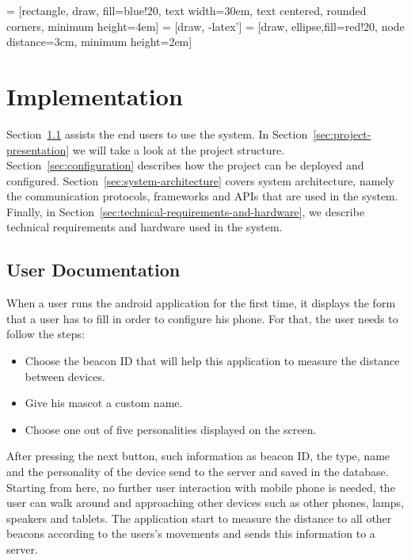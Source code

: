  = [rectangle, draw, fill=blue!20,
text width=30em, text centered, rounded corners, minimum height=4em]
 = [draw, -latex']
 = [draw, ellipse,fill=red!20, node distance=3cm,
minimum height=2em]

\chapter{Implementation}
\label{ch:implementation}
Section~\ref{sec:user-documentation} assists the end users to use the system.
In Section~\ref{sec:project-presentation} we will take a look at the project structure.
Section~\ref{sec:configuration} describes how the project can be deployed and configured.
Section~\ref{sec:system-architecture} covers system architecture, namely the
communication protocols, frameworks and APIs that are used in the system.
Finally, in Section~\ref{sec:technical-requirements-and-hardware}, we describe technical
requirements and hardware used in the system.

\section{User Documentation}
\label{sec:user-documentation}
When a user runs the android application for the first time, it displays the form that a
user has to fill in order to configure his phone.
For that, the user needs to follow the steps:

\begin{itemize}
    \item Choose the beacon ID that will help this application to measure the distance between devices.
    \item Give his mascot a custom name.
    \item Choose one out of five personalities displayed on the screen.
\end{itemize}

After pressing the next button, such information as beacon ID,
the type, name and the personality of the device send to the server and saved in the database.
Starting from here, no further user interaction with mobile phone is needed, the user can walk
around and approaching other devices such as other phones, lamps, speakers and tablets.
The application start to measure the distance to all other beacons according to the users's
movements and sends this information to a server.

